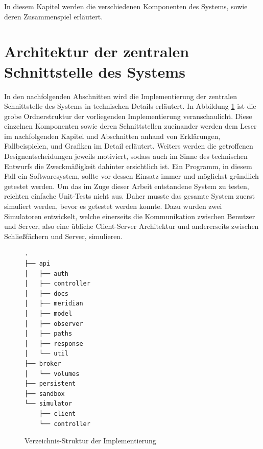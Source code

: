 In diesem Kapitel werden die verschiedenen Komponenten des Systems, sowie deren Zusammenspiel erläutert. %

\section{Architektur der zentralen Schnittstelle des Systems}
In den nachfolgenden Abschnitten wird die Implementierung der zentralen Schnittstelle des Systems in technischen Details erläutert. In Abbildung \ref{fig:impl:dir-structure} ist die grobe Ordnerstruktur der vorliegenden Implementierung veranschaulicht. Diese einzelnen Komponenten sowie deren Schnittstellen zueinander werden dem Leser im nachfolgenden Kapitel und Abschnitten anhand von Erklärungen, Fallbeispielen, und Grafiken im Detail erläutert. Weiters werden die getroffenen Designentscheidungen jeweils motiviert, sodass auch im Sinne des technischen Entwurfs die Zweckmäßigkeit dahinter ersichtlich ist. Ein Programm, in diesem Fall ein Softwaresystem, sollte vor dessen Einsatz immer und möglichst gründlich getestet werden. \newpage Um das im Zuge dieser Arbeit entstandene System zu testen, reichten einfache Unit-Tests nicht aus. Daher musste das gesamte System zuerst simuliert werden, bevor es getestet werden konnte. Dazu wurden zwei Simulatoren entwickelt, welche einerseits die Kommunikation zwischen Benutzer und Server, also eine übliche Client-Server Architektur und andererseits zwischen Schließfächern und Server, simulieren.
\begin{figure}
\begin{lstlisting}[style=directoryListing,label={lst:impl:dirstructure}]
.
├── api
│   ├── auth
│   ├── controller
│   ├── docs
│   ├── meridian
│   ├── model
│   ├── observer
│   ├── paths
│   ├── response
│   └── util
├── broker
│   └── volumes
├── persistent
├── sandbox
└── simulator
    ├── client
    └── controller
\end{lstlisting}
\caption{Verzeichnis-Struktur der Implementierung}
\label{fig:impl:dir-structure}
\end{figure}
